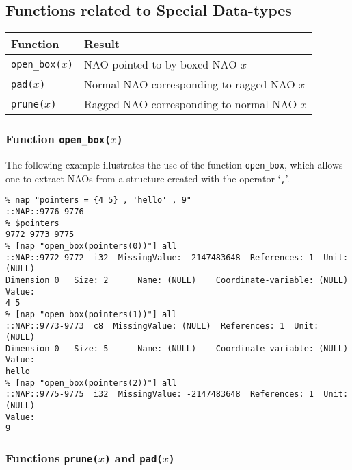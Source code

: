 \subsection{Functions related to Special Data-types}
    \label{function-Special-Data-types}

  \begin{tabular}{|l|l|}
    \hline 
      \textbf{Function} & \textbf{Result}
    \\
      \hline 
      \hline 
        \texttt{open\_box(}$x$\texttt{)} & NAO pointed to by boxed NAO $x$
      \\
      \hline 
        \texttt{pad(}$x$\texttt{)} & Normal NAO corresponding to ragged NAO $x$
      \\
      \hline 
        \texttt{prune(}$x$\texttt{)} & Ragged NAO corresponding to normal NAO $x$
      \\
  \hline
\end{tabular}

\subsubsection{Function \texttt{open\_box(}$x$\texttt{)}}
    \label{function-open-box}

The following example illustrates the use of the function 
  \texttt{open\_box}, which allows one to extract NAOs from a
  structure created with the operator `\texttt{,}'.
  \begin{verbatim}
% nap "pointers = {4 5} , 'hello' , 9"
::NAP::9776-9776
% $pointers
9772 9773 9775
% [nap "open_box(pointers(0))"] all
::NAP::9772-9772  i32  MissingValue: -2147483648  References: 1  Unit: (NULL)
Dimension 0   Size: 2      Name: (NULL)    Coordinate-variable: (NULL)
Value:
4 5
% [nap "open_box(pointers(1))"] all
::NAP::9773-9773  c8  MissingValue: (NULL)  References: 1  Unit: (NULL)
Dimension 0   Size: 5      Name: (NULL)    Coordinate-variable: (NULL)
Value:
hello
% [nap "open_box(pointers(2))"] all
::NAP::9775-9775  i32  MissingValue: -2147483648  References: 1  Unit: (NULL)
Value:
9
\end{verbatim}

\subsubsection{Functions \texttt{prune(}$x$\texttt{)} and \texttt{pad(}$x$\texttt{)}}
    \label{functions-prune-pad}

